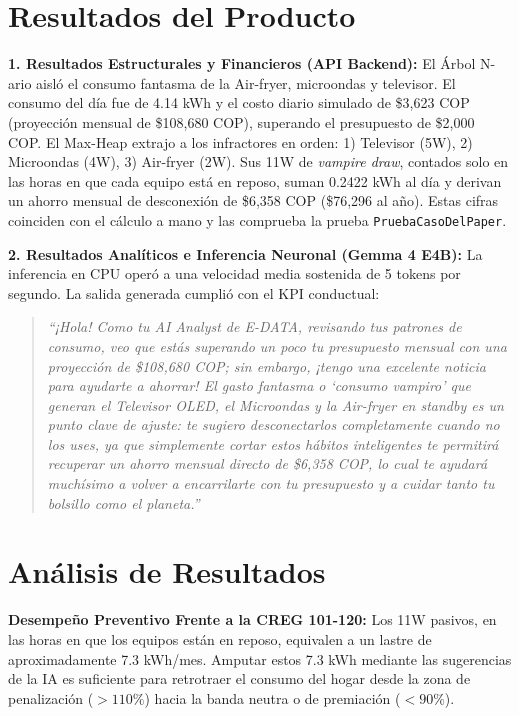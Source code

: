 \documentclass[10pt,journal,compsoc]{IEEEtran}
\begin{document}
\section{Resultados del Producto}
\label{sec:resultados}
\textbf{1. Resultados Estructurales y Financieros (API Backend):} El Árbol N-ario aisló el consumo fantasma de la Air-fryer, microondas y televisor. El consumo del día fue de 4.14 kWh y el costo diario simulado de \$3,623 COP (proyección mensual de \$108,680 COP), superando el presupuesto de \$2,000 COP. El Max-Heap extrajo a los infractores en orden: 1) Televisor (5W), 2) Microondas (4W), 3) Air-fryer (2W). Sus 11W de \emph{vampire draw}, contados solo en las horas en que cada equipo está en reposo, suman 0.2422 kWh al día y derivan un ahorro mensual de desconexión de \$6,358 COP (\$76,296 al año). Estas cifras coinciden con el cálculo a mano y las comprueba la prueba \texttt{PruebaCasoDelPaper}.

\textbf{2. Resultados Analíticos e Inferencia Neuronal (Gemma 4 E4B):} La inferencia en CPU operó a una velocidad media sostenida de 5 tokens por segundo. La salida generada cumplió con el KPI conductual:

\begin{quote}
\emph{``¡Hola! Como tu AI Analyst de E-DATA, revisando tus patrones de consumo, veo que estás superando un poco tu presupuesto mensual con una proyección de \$108,680 COP; sin embargo, ¡tengo una excelente noticia para ayudarte a ahorrar! El gasto fantasma o `consumo vampiro' que generan el Televisor OLED, el Microondas y la Air-fryer en standby es un punto clave de ajuste: te sugiero desconectarlos completamente cuando no los uses, ya que simplemente cortar estos hábitos inteligentes te permitirá recuperar un ahorro mensual directo de \$6,358 COP, lo cual te ayudará muchísimo a volver a encarrilarte con tu presupuesto y a cuidar tanto tu bolsillo como el planeta.''}
\end{quote}

\section{Análisis de Resultados}
\textbf{Desempeño Preventivo Frente a la CREG 101-120:} Los 11W pasivos, en las horas en que los equipos están en reposo, equivalen a un lastre de aproximadamente 7.3 kWh/mes. Amputar estos 7.3 kWh mediante las sugerencias de la IA es suficiente para retrotraer el consumo del hogar desde la zona de penalización ($>110\%$) hacia la banda neutra o de premiación ($<90\%$).
\end{document}
